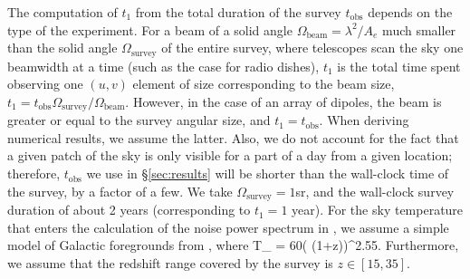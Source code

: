 The computation of $t_1$ from the total duration of the survey  $t_\text{obs}$ depends on the type of the experiment.  For a beam of a solid angle $\Omega_\text{beam}=\lambda^2/A_e$ much smaller than the solid angle $\Omega_\text{survey}$ of the entire survey, where telescopes scan the sky one beamwidth at a time (such as the case for radio dishes), $t_1$ is the total time spent observing one $(u,v)$ element of size corresponding to the beam size, $t_1=t_\text{obs}\Omega_\text{survey}/\Omega_\text{beam}$. However, in the case of an array of dipoles, the beam is greater or equal to the survey angular size, and $t_1=t_\text{obs}$. When deriving numerical results, we assume the latter. Also, we do not account for the fact that a given patch of the sky is only visible for a part of a day from a given location; therefore, $t_\text{obs}$ we use in \S\ref{sec:results} will be shorter than the wall-clock time of the survey, by a factor of a few. We take $\Omega_\text{survey}=1$sr, and the wall-clock survey duration of about 2 years (corresponding to $t_1=1$ year).%
For the sky temperature that enters the calculation of the noise power spectrum in \eq{\ref{eq:Pnoise_K}}, we assume a simple model of Galactic foregrounds from \cite{2008PhRvD..78b3529M}, where
\beq
T_  = 60\left( (1+z)\right)^{2.55}\text{   [K]}.
\label{eq:tsys}
\eeq
Furthermore, we assume that the redshift range covered by the survey is $z\in[15,35]$.  

